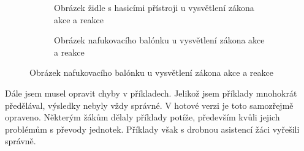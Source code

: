 \begin{figure}[H]
    \begingroup
    \makeatletter
    \renewcommand\thesubfigure{\thefigure~--~\@nameuse{subfiglabel@\alph{subfigure}}}
    \newcommand{\subfiglabel@a}{vlevo}
    \newcommand{\subfiglabel@b}{vpravo}
    \captionsetup[subfigure]{labelformat=simple, labelsep=colon}
    \renewcommand\p@subfigure{}
    \makeatother
    \begin{subfigure}{0.47\textwidth}
        \centering
        \setlength{\fboxsep}{0pt}
        \caption{Obrázek židle s hasicími přístroji u vysvětlení zákona akce a reakce \jaObr}
        \label{obr:zidlePrezentace}
    \end{subfigure}\hfill
    \begin{subfigure}{0.47\textwidth}
        \centering
        \setlength{\fboxsep}{0pt}
        \caption{Obrázek nafukovacího balónku u vysvětlení zákona akce a reakce \jaObr}
        \label{obr:balonekPrezentace}
    \end{subfigure}
    \endgroup
\end{figure}
{Dále jsem musel opravit chyby v příkladech. Jelikož jsem příklady mnohokrát předělával, výsledky nebyly vždy správné. V hotové verzi je toto samozřejmě opraveno. Některým žákům dělaly příklady potíže, především kvůli jejich problémům s převody jednotek. Příklady však s drobnou asistencí žáci vyřešili správně.}
